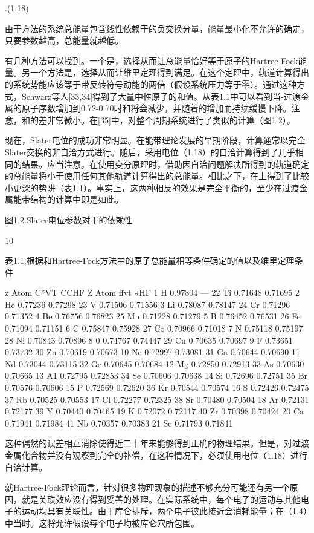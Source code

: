 .(1.18)

由于方法的系统总能量包含线性依赖于的负交换分量，能量最小化不允许的确定，只要参数越高，总能量就越低。

有几种方法可以找到。一个是，选择从而让总能量恰好等于原子的Hartree-Fock能量。另一个方法是，选择从而让维里定理得到满足。在这个定理中，轨道计算得出的系统势能应该等于带反转符号动能的两倍（假设系统压力等于零）。通过这种方式，Schwarz等人[33,34]得到了大量中性原子的和值。从表1.1中可以看到当-过渡金属的原子序数增加到0.72-0.70时和将会减少，并随着的增加而持续缓慢下降。注意，和的差非常微小。在[35]中，对整个周期系统进行了类似的计算（图1.2）。

现在，Slater电位的成功非常明显。在能带理论发展的早期阶段，计算通常以完全Slater交换的非自洽方式进行。随后，采用电位（1.18）的自洽计算得到了几乎相同的结果。应当注意，在使用变分原理时，借助因自洽问题解决所得到的轨道确定的总能量将小于使用任何其他轨道计算得出的总能量。相比之下，在上得到了比较小更深的势阱（表1.1）。事实上，这两种相反的效果是完全平衡的，至少在过渡金属能带结构的计算中即是如此。 

图1.2.Slater电位参数对于的依赖性


10


表1.1.根据和Hartree-Fock方法中的原子总能量相等条件确定的值以及维里定理条件

z
Atom
C*VT
CCHF
Z
Atom
ffvt
«HF
1
H
0.97804
—
22
Ti
0.71648
0.71695
2
He
0.77236
0.77298
23
V
0.71506
0.71556
3
Li
0.78087
0.78147
24
Cr
0.71296
0.71352
4
Be
0.76756
0.76823
25
Mn
0.71228
0.71279
5
B
0.76452
0.76531
26
Fe
0.71094
0.71151
6
C
0.75847
0.75928
27
Co
0.70966
0.71018
7
N
0.75118
0.75197
28
Ni
0.70843
0.70896
8
0
0.74767
0.74447
29
Cu
0.70635
0.70697
9
F
0.73651
0.73732
30
Zn
0.70619
0.70673
10
Ne
0.72997
0.73081
31
Ga
0.70644
0.70690
11
Nd
0.73044
0.73115
32
Ge
0.70645
0.70684
12
Mg
0.72850
0.72913
33
As
0.70630
0.70665
13
A1
0.72795
0.72853
34
Se
0.70606
0.70638
14
Si
0.72696
0.72751
35
Br
0.70576
0.70606
15
P
0.72569
0.72620
36
Kr
0.70544
0.70574
16
S
0.72426
0.72475
37
Rb
0.70525
0.70553
17
Cl
0.72277
0.72325
38
Sr
0.70480
0.70504
18
Ar
0.72131
0.72177
39
Y
0.70440
0.70465
19
K
0.72072
0.72117
40
Zr
0.70398
0.70424
20
Ca
0.71941
0.71984
41
Nb
0.70357
0.70383
21
Sc
0.71793
0.71841





这种偶然的误差相互消除使得近二十年来能够得到正确的物理结果。但是，对过渡金属化合物并没有观察到完全的补偿，在这种情况下，必须使用电位（1.18）进行自洽计算。

就Hartree-Fock理论而言，针对很多物理现象的描述不够充分可能还有另一个原因，就是关联效应没有得到妥善的处理。在实际系统中，每个电子的运动与其他电子的运动均具有关联性。由于库仑排斥，两个电子彼此接近会消耗能量；在（1.4）中当时。这将允许假设每个电子均被库仑穴所包围。

